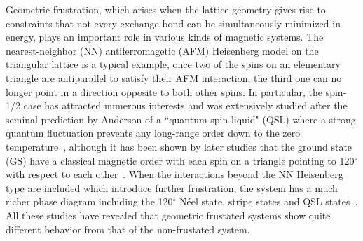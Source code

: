 \documentclass[aps,prb,reprint,amsfonts,amsmath,amssymb,showpacs,groupedaddress,superscriptaddress]{revtex4-1}
\begin{document}
Geometric frustration, which arises when the lattice geometry gives rise to constraints that not every exchange bond can be simultaneously minimized in energy, plays an important role in various kinds of magnetic systems. The nearest-neighbor (NN) antiferromagetic (AFM) Heisenberg model on the triangular lattice is a typical example, once two of the spins on an elementary triangle are antiparallel to satisfy their AFM interaction, the third one can no longer point in a direction opposite to both other spins. In particular, the spin-1/2 case has attracted numerous interests and was extensively studied after the seminal prediction by Anderson of a ``quantum spin liquid" (QSL) where a strong quantum fluctuation prevents any long-range order down to the zero temperature~\cite{Anderson1973}, although it has been shown by later studies that the ground state (GS) have a classical magnetic order with each spin on a triangle pointing to 120$^\circ$ with respect to each other~\cite{PhysRevLett.99.127004,PhysRevLett.82.3899,PhysRevB.50.10048,PhysRevLett.60.2531}. When the interactions beyond the NN Heisenberg type are included which introduce further frustration, the system has a much richer phase diagram including the 120$^\circ$ N\'{e}el state, stripe states and QSL states~\cite{PhysRevB.91.014426,PhysRevB.92.041105,PhysRevB.92.140403,PhysRevB.96.165141,PhysRevB.93.144411,JPSJ.83.093707,PhysRevB.94.121111,PhysRevB.96.075116,PhysRevLett.120.207203,PhysRevB.95.165110,PhysRevLett.123.207203,PhysRevX.9.031026,wu2020exact}. All these studies have revealed that geometric frustated systems show quite different behavior from that of the non-frustated system.
\end{document}
